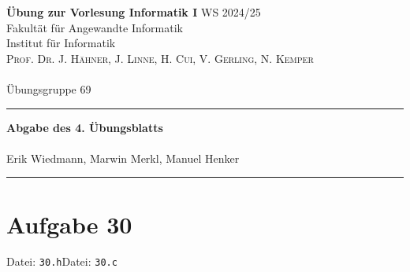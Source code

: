 \documentclass[paper=a4, %
         fontsize=10pt,  %
         oneside,        %
         headsepline,    %
         notitlepage     %
]{scrartcl}              %
\newcommand{\includecode}[1]{}
\newcommand{\includecodewithfilename}[1]{Datei: \texttt{#1}\vspace*{-1.5mm}\includecode{#1}}
\newcommand{\ownline}{\vspace{.7em}\hrule\vspace{.7em}}
\newcommand{\aufgabe}[1]{\section*{Aufgabe #1}}
\begin{document}
\textbf{Übung zur Vorlesung Informatik I} \hfill{WS 2024/25} \\  
Fakultät für Angewandte Informatik \\
Institut für Informatik \\
\textsc{Prof. Dr. J. Hähner, J. Linne, H. Cui, V. Gerling, N. Kemper} \\
\mbox{} \\
{\large Übungsgruppe 69} %
\ownline
\begin{center}
	{\LARGE \textbf{Abgabe des 4. Übungsblatts}} \\ %
	\mbox{} \\
	{\large Erik Wiedmann, Marwin Merkl, Manuel Henker} \\ %
\end{center}
\ownline


\aufgabe{30}\includecodewithfilename{30.h}\includecodewithfilename{30.c}
\end{document}
